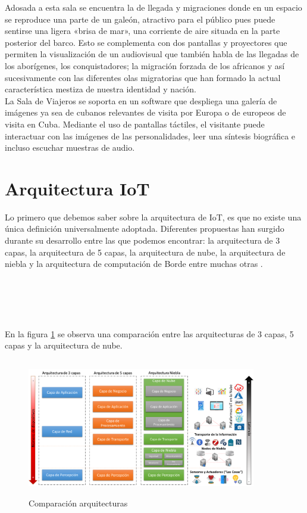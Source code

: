         Adosada a esta sala se encuentra la de llegada y migraciones donde en un espacio se reproduce una parte de un galeón, atractivo para el público pues puede sentirse una ligera «brisa de mar», una corriente de aire situada en la parte posterior del barco. Esto se complementa con dos pantallas y proyectores que permiten la visualización de un audiovisual que también habla de las llegadas de los aborígenes, los conquistadores; la migración forzada de los africanos y así sucesivamente con las diferentes olas migratorias que han formado la actual característica mestiza de nuestra identidad y nación.\\
        
        La Sala de Viajeros se soporta en un software que despliega una galería de imágenes ya sea de cubanos relevantes de visita por Europa o de europeos de visita en Cuba. Mediante el uso de pantallas táctiles, el visitante puede interactuar con las imágenes de las personalidades, leer una síntesis biográfica e incluso escuchar muestras de audio.
    
        
    \section{Arquitectura IoT}\label{sec:arquitecturas}

    Lo primero que debemos saber sobre la arquitectura de IoT, es que no existe una única definición universalmente adoptada. Diferentes propuestas han surgido durante su desarrollo entre las que podemos encontrar: la arquitectura de 3 capas, la arquitectura de 5 capas, la arquitectura de nube, la arquitectura de niebla y la arquitectura de computación de Borde entre muchas otras \cite{arquitecturaIEEE}.\\\\\\\\\\\\

    En la figura \ref{imag:comparacionArquitecturas} se observa una comparación entre las arquitecturas de 3 capas, 5 capas y la arquitectura de nube.

    \begin{figure}[h]
        \centering
        \includegraphics[width=10cm, height=6cm]{imagenes/Comparacion-arquitecturas-1024x535}
        \caption{Comparación arquitecturas}
        \label{imag:comparacionArquitecturas}
    \end{figure}

